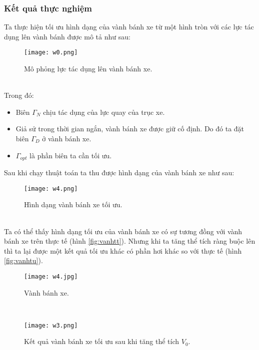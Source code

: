 \documentclass[
12pt, %
oneside, %
english, %
onehalfspacing, %
nolistspacing, %
headsepline, %
addchap,
]{MastersDoctoralThesis} %
\begin{document}
\subsubsection*{Kết quả thực nghiệm}
Ta thực hiện tối ưu hình dạng của vành bánh xe từ một hình tròn với các lực tác dụng lên vành bánh được mô tả như sau:
\begin{figure}[http]
\centering
\texttt{[image: w0.png]}
\caption{Mô phỏng lực tác dụng lên vành bánh xe.}
\label{fig:w0}
\end{figure}\\
Trong đó:
\begin{itemize}
\item Biên $\Gamma_N$ chịu tác dụng của lực quay của trục xe.
\item Giả sử trong thời gian ngắn, vành bánh xe được giữ cố định. Do đó ta đặt biên $\Gamma_D$ ở vành bánh xe.
\item $\Gamma_{opt}$ là phần biên ta cần tối ưu.
\end{itemize}
Sau khi chạy thuật toán ta thu được hình dạng của vành bánh xe như sau:
\begin{figure}[http]
\centering
\texttt{[image: w4.png]}
\caption{Hình dạng vành bánh xe tối ưu.}
\label{fig:w0}
\end{figure}\\
Ta có thể thấy hình dạng tối ưu của vành bánh xe có sự tương đồng với vành bánh xe trên thực tế (hình \ref{fig:vanhtt}). Nhưng khi ta tăng thể tích ràng buộc lên thì ta lại được một kết quả tối ưu khác có phần hơi khác so với thực tế (hình \ref{fig:vanhtu}).
\begin{figure}[http]
\centering
\texttt{[image: w4.jpg]}
\caption{Vành bánh xe.}\label{fig:vanhtt}
\label{fig:w0}
\end{figure}\\
\begin{figure}[http]
\centering
\texttt{[image: w3.png]}
\caption{Kết quả vành bánh xe tối ưu sau khi tăng thể tích $V_0$.}\label{fig:vanhtu}
\label{fig:w0}
\end{figure}\\
\end{document}
